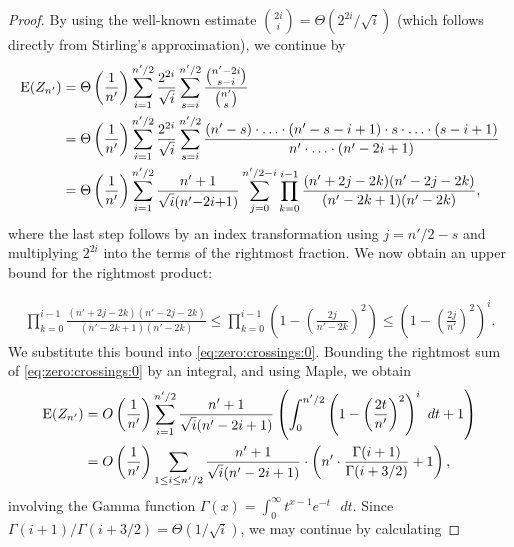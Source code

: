 \documentclass[prodmode,acmtalg]{acmsmall}
\newcommand{\E}{\textnormal{\textrm{E}}}
\begin{document}
\begin{proof}
By using the well-known estimate $\binom{2i}{i} = 
\Theta(2^{2i}/\sqrt{i})$ (which follows directly from Stirling's
approximation), we
continue by
\begin{align}
    \E(Z_{n'})
    &= \Theta\left(\frac{1}{n'}\right) \sum_{i =1}^{n'/2} \frac{2^{2i}}{\sqrt{i}}
\sum_{s=i}^{n'/2} 
    \frac{\binom{n'-2i}{s - i}}{\binom{n'}{s}}\notag\\
&=\Theta\left(\frac{1}{n'}\right) \sum_{i=1}^{n'/2} \frac{2^{2i}}{\sqrt{i}} \sum_{s =
i}^{n'/2} 
\frac{(n' - s) \cdot \ldots \cdot (n' - s - i + 1) \cdot s 
\cdot \ldots \cdot (s-i + 1)}{n' \cdot \ldots \cdot (n' - 2i + 1)}\notag\\
&=\Theta\left(\frac{1}{n'}\right) \sum_{i = 1}^{n'/2} \frac{n'+1}{\sqrt{i}(n' {-} 2i {+} 1)} \sum_{j = 0}^{n'/2-i}
\prod_{k = 0}^{i - 1} \frac{(n'+2j - 2k)(n'-2j - 2k)}{(n' - 2k + 1)(n' -
2k)},\label{eq:zero:crossings:0}
\end{align}
where the last step follows by an index transformation using $j = n'/2 - s$ and multiplying $2^{2i}$ into the 
terms of the rightmost fraction. We now obtain an upper bound for the rightmost product:

\begin{align*}
\prod_{k = 0}^{i - 1} \frac{(n'+2j - 2k)(n'-2j - 2k)}{(n' - 2k + 1)(n' -
2k)} \leq \prod_{k = 0}^{i - 1} \left(1 - \left(\frac{2j}{n'-2k}\right)^2\right) 
\leq \left(1 - \left(\frac{2j}{n'}\right)^2\right)^i.
\end{align*}
We substitute this bound into \eqref{eq:zero:crossings:0}. Bounding the rightmost sum of
\eqref{eq:zero:crossings:0} by an integral, and using Maple\textsuperscript{\textregistered},
we obtain
\begin{align*}
\E(Z_{n'}) &=  O\left(\frac{1}{n'}\right) \sum_{i=1}^{n'/2} \frac{n'+1}{\sqrt{i}(n' - 2i + 1)} \left(\int_0^{n'/2} 
    \left(1 - \left(\frac{2t}{n'}\right)^2\right)^{i} \text{ $dt$} + 1\right)\\
    &=O\left(\frac{1}{n'}\right) \sum_{1 \leq i \leq n'/2} \frac{n'+1}{\sqrt{i}(n' - 2i + 1)} 
        \cdot \left(n' \cdot \frac{\Gamma(i+1)}{\Gamma(i + 3/2)} + 1 \right),\\
\end{align*}
    involving the Gamma function $\Gamma(x) =
    \int_{0}^{\infty}t^{x-1}e^{-t} \text{ $dt$}$.
    Since $\Gamma(i+1)/\Gamma(i+3/2) = \Theta(1/\sqrt{i})$, we may continue by
calculating


\end{proof}
\end{document}
